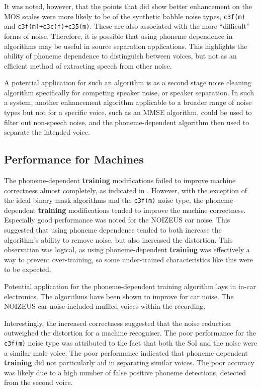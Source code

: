 It was noted, however, that the points that did show better enhancement
on the \ac{MOS} scales were more likely to be of the synthetic babble
noise types, \lstinline!c3f(m)! and \lstinline!c3f(m)+c3c(f)+c35(m)!.
These are also associated with the more ``difficult'' forms of noise.
Therefore, it is possible that using phoneme dependence in algorithms
may be useful in source separation applications. This highlights the
ability of phoneme dependence to distinguish between voices, but not
as an efficient method of extracting speech from other noise.

A potential application for such an algorithm is as a second stage
noise cleaning algorithm specifically for competing speaker noise,
or speaker separation. In such a system, another enhancement algorithm
applicable to a broader range of noise types but not for a specific
voice, such as an \ac{MMSE} algorithm, could be used to filter out
non-speech noise, and the phoneme-dependent algorithm then used to
separate the intended voice.


\subsection{Performance for Machines}

The phoneme-dependent \textbf{training} modifications failed to improve
machine correctness almost completely, as indicated in .
However, with the exception of the ideal binary mask algorithms and
the \lstinline!c3f(m)! noise type, the phoneme-dependent \textbf{training}
modifications tended to improve the machine correctness. Especially
good performance was noted for the NOIZEUS car noise. This suggested
that using phoneme dependence tended to both increase the algorithm's
ability to remove noise, but also increased the distortion. This observation
was logical, as using phoneme-dependent \textbf{training} was effectively
a way to prevent over-training, so some under-trained characteristics
like this were to be expected.

Potential application for the phoneme-dependent training algorithm
lays in in-car electronics. The algorithms have been shown to improve
for car noise. The NOIZEUS car noise included muffled voices within
the recording.

Interestingly, the increased correctness suggested that the noise
reduction outweighed the distortion for a machine recogniser. The
poor performance for the \lstinline!c3f(m)! noise type was attributed
to the fact that both the \ac{SoI} and the noise were a similar male
voice. The poor performance indicated that phoneme-dependent \textbf{training}
did not particularly aid in separating similar voices. The poor accuracy
was likely due to a high number of false positive phoneme detections,
detected from the second voice.

